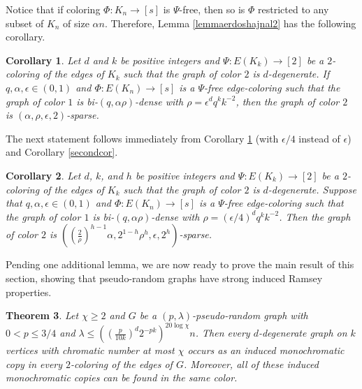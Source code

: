 \documentclass[11pt]{article}
\newtheorem{theorem}{Theorem}[section]
\newtheorem{corollary}[theorem]{Corollary}
\begin{document}
Notice that if coloring $\Phi:K_n \rightarrow [s]$ is $\Psi$-free,
then so is $\Phi$ restricted to any subset of $K_n$ of size $\alpha n$. Therefore,
Lemma \ref{lemmaerdoshajnal2} has the following corollary.

\begin{corollary}\label{last}
Let $d$ and $k$ be positive integers and $\Psi:E(K_k) \rightarrow
[2]$ be a $2$-coloring of the edges of $K_k$ such that the graph of
color $2$ is $d$-degenerate. If $q,\alpha,\epsilon \in (0,1)$ and
$\Phi:E(K_n) \rightarrow [s]$ is a $\Psi$-free edge-coloring such
that the graph of color $1$ is bi-$(q,\alpha\rho)$-dense with
$\rho=\epsilon^{d}q^{k} k^{-2}$, then the graph of color $2$ is
$(\alpha,\rho,\epsilon,2)$-sparse.
\end{corollary}

\noindent
The next statement follows immediately from
Corollary \ref{last} (with $\epsilon/4$ instead of $\epsilon $) and Corollary \ref{secondcor}.

\begin{corollary}\label{last2}
Let $d$, $k$, and $h$ be positive integers and $\Psi:E(K_k)
\rightarrow [2]$ be a $2$-coloring of the edges of $K_k$ such that
the graph of color $2$ is $d$-degenerate. Suppose that
$q,\alpha,\epsilon \in (0,1)$ and $\Phi:E(K_n) \rightarrow [s]$ is
a $\Psi$-free edge-coloring such that the graph of color $1$ is
bi-$(q,\alpha\rho)$-dense with
$\rho=(\epsilon/4)^dq^{k}k^{-2}$. Then the graph of color $2$ is
$((\frac{2}{\rho})^{h-1}\alpha,2^{1-h}\rho^h,\epsilon,2^h)$-sparse.
\end{corollary}

\noindent
Pending one additional lemma, we are now ready to prove the main result of this
section, showing that pseudo-random graphs have strong induced
Ramsey properties.

\begin{theorem}\label{quasirandominduced}
Let $\chi \geq 2$ and $G$ be a $(p,\lambda)$-pseudo-random graph with
$0 <p \leq 3/4$ and $\lambda \leq ((\frac{p}{10k})^d2^{-pk})^{20\log
\chi}n$. Then every $d$-degenerate graph on $k$ vertices with chromatic
number at most $\chi$ occurs as an induced monochromatic copy in every
$2$-coloring of the edges of $G$. Moreover, all of these induced
monochromatic copies can be found in the same color.
\end{theorem}
\end{document}

